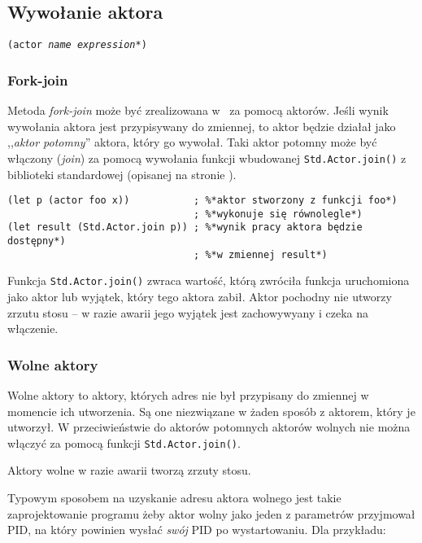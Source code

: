 \subsection{Wywołanie aktora}
\label{viuact_spec_actor_call}

\texttt{(actor \emph{name} \emph{expression}*)}

\subsubsection{Fork-join}

Metoda \emph{fork-join} może być zrealizowana w \ViuAct\ za pomocą aktorów. Jeśli wynik wywołania aktora jest
przypisywany do zmiennej, to aktor będzie działał jako ,,\emph{aktor potomny}'' aktora, który go wywołał. Taki
aktor potomny może być włączony (\emph{join}) za pomocą wywołania funkcji wbudowanej \texttt{Std.Actor.join()}
z biblioteki standardowej (opisanej na stronie \pageref{Std_Actor_join}).

\begin{lstlisting}
(let p (actor foo x))           ; %*aktor stworzony z funkcji foo*)
                                ; %*wykonuje się równolegle*)
(let result (Std.Actor.join p)) ; %*wynik pracy aktora będzie dostępny*)
                                ; %*w zmiennej result*)
\end{lstlisting}

Funkcja \texttt{Std.Actor.join()} zwraca wartość, którą zwróciła funkcja uruchomiona jako aktor lub wyjątek,
który tego aktora zabił. Aktor pochodny nie utworzy zrzutu stosu -- w razie awarii jego wyjątek jest
zachowywyany i czeka na włączenie.

\subsubsection{Wolne aktory}

Wolne aktory to aktory, których adres nie był przypisany do zmiennej w momencie ich utworzenia. Są one
niezwiązane w żaden sposób z aktorem, który je utworzył. W przeciwieństwie do aktorów potomnych aktorów
wolnych nie można włączyć za pomocą funkcji \texttt{Std.Actor.join()}.

Aktory wolne w razie awarii tworzą zrzuty stosu.

Typowym sposobem na uzyskanie adresu aktora wolnego jest takie zaprojektowanie programu żeby aktor wolny jako
jeden z parametrów przyjmował PID, na który powinien wysłać \emph{swój} PID po wystartowaniu. Dla przykładu:

